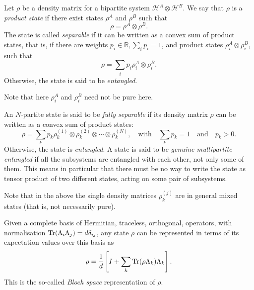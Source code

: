 \documentclass[a4paper]{report}
\newcommand{\RR}{\mathbb{R}}
\begin{document}
\begin{defn}
	Let $\rho$ be a density matrix for a bipartite system $\mathcal H^A \otimes \mathcal H^B$.
	We say that $\rho$ is a \emph{product state} if there exist states $\rho^A$ and $\rho^B$ such that
	\begin{equation}
		\rho = \rho^A \otimes \rho^B.
	\end{equation}
	The state is called \emph{separable} if it can be written as a convex sum of product states, that is, if there are weights $p_i\in\RR, \sum_i p_i=1$, and product states $\rho_i^A \otimes \rho_i^B$, such that
	\begin{equation}
		\rho = \sum_i p_i \rho_i^A \otimes \rho_i^B.
	\end{equation}
	Otherwise, the state is said to be \emph{entangled}.
\end{defn}
Note that here $\rho_i^A$ and $\rho_i^B$ need not be pure here.

\begin{defn}
	An $N$-partite state is said to be \emph{fully separable} if its density matrix $\rho$ can be written as a convex sum of product states:
	\begin{equation}
		\rho = \sum_k p_k \rho_k^{(1)} \otimes \rho_k^{(2)} \otimes \cdots \otimes \rho_k^{(N)},
		\quad \text{with} \quad
		\sum_k p_k = 1
		\quad \text{and}\quad
		p_k > 0.
	\end{equation}
	Otherwise, the state is \emph{entangled}.
	A state is said to be \emph{genuine multipartite entangled} if all the subsystems are entangled with each other, not only some of them.
	This means in particular that there must be no way to write the state as tensor product of two different states, acting on some pair of subsystems.
\end{defn}
Note that in the above the single density matrices $\rho_k^{(j)}$ are in general mixed states (that is, not necessarily pure).

\begin{prop}
	Given a complete basis of Hermitian, traceless, orthogonal, operators, with normalisation $\Tr(\Lambda_i\Lambda_j)=d\delta_{ij}$, any state $\rho$ can be represented in terms of its expectation values over this basis as
	\begin{equation}
		\rho = \frac{1}{d}\left[ I + \sum_k \Tr(\rho\Lambda_k)\Lambda_k \right].
	\end{equation}
	This is the so-called \emph{Bloch space} representation of $\rho$.
\end{prop}
\end{document}
